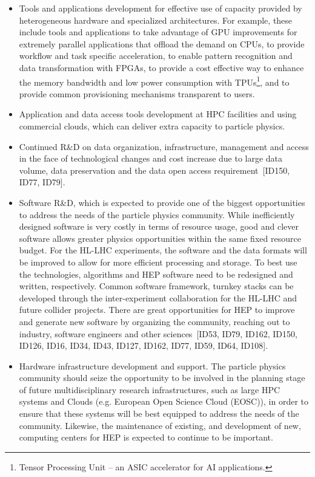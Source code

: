 \begin{itemize}
    \item Tools and applications development for effective use of capacity provided by heterogeneous hardware and specialized architectures.
    For example, these include tools and applications to take advantage of
    GPU improvements for extremely parallel applications that offload the demand on CPUs, to provide workflow and task specific acceleration, to enable pattern recognition and data transformation with FPGAs, to provide a cost effective way to enhance the memory bandwidth and low power consumption with TPUs\footnote{Tensor Processing Unit -- an ASIC accelerator for AI applications.}, and to provide common provisioning mechanisms transparent to users.
    \item Application and data access tools development at HPC facilities and using commercial clouds, which can deliver extra capacity to particle physics.  
    
    \item Continued R\&D on data organization, infrastructure, management and access in the face of technological changes and cost increase due to large data volume, data preservation and the data open access requirement~[ID150, ID77, ID79]. 
 
    \item Software R\&D, which is expected to provide one of the biggest opportunities to address the needs of the particle physics community.  While inefficiently designed software is very costly in terms of resource usage, good and clever software allows greater physics opportunities within the same fixed resource budget.  For the HL-LHC experiments, the software and the data formats will be improved to allow for more efficient processing and storage. To best use the technologies, algorithms and HEP software need to be redesigned and written, respectively. Common software framework, turnkey stacks can be developed through the inter-experiment collaboration for the HL-LHC and future collider projects. There are great opportunities for HEP to improve and generate new software by organizing the community, reaching out to industry, software engineers and other sciences~[ID53, ID79, ID162, ID150, ID126, ID16, ID34, ID43, ID127, ID162, ID77, ID59, ID64, ID108].
    
    \item Hardware infrastructure development and support. The particle physics community should seize the opportunity to be involved in the planning stage of future multidisciplinary research infrastructures, such as large HPC systems and Clouds (e.g. European Open Science Cloud (EOSC)), in order to ensure that these systems will be best equipped to address the needs of the community.  Likewise, the maintenance of existing, and development of new, computing centers for HEP is expected to continue to be important.
    

\end{itemize}
